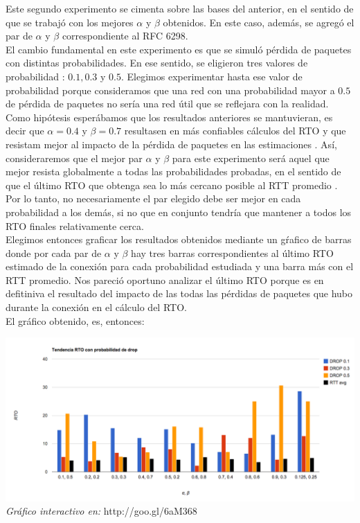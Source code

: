 \indent \indent Este segundo experimento se cimenta sobre las bases del anterior, en el sentido de que se trabajó con los mejores $\alpha$ y $\beta$ obtenidos. En este caso, además, se agregó el par de $\alpha$ y $\beta$ correspondiente al RFC 6298.\\
\indent \indent El cambio fundamental en este experimento es que se simuló pérdida de paquetes con distintas probabilidades. En ese sentido, se eligieron tres valores de probabilidad : $0.1, 0.3$ y $0.5$. Elegimos experimentar hasta ese valor de probabilidad porque consideramos que una red con una probabilidad mayor a $0.5$ de pérdida de paquetes no sería una red útil que se reflejara con la realidad.\\
\indent Como hipótesis esperábamos que los resultados anteriores se mantuvieran, es decir que $\alpha = 0.4$ y $\beta=0.7$ resultasen en más confiables cálculos del RTO y que resistam mejor al impacto de la pérdida de paquetes en las estimaciones . Así, consideraremos que el mejor par $\alpha$ y $\beta$ para este experimento será aquel que mejor resista globalmente a todas las probabilidades probadas, en el sentido de que el último RTO que obtenga sea lo más cercano posible al RTT promedio . Por lo tanto, no necesariamente el par elegido debe ser mejor en cada probabilidad a los demás, si no que en conjunto tendría que mantener a todos los RTO finales relativamente cerca.\\
\indent Elegimos entonces graficar los resultados obtenidos mediante un gŕafico de barras donde por cada par de $\alpha$ y $\beta$ hay tres barras correspondientes al último RTO estimado de la conexión para cada probabilidad estudiada y una barra más con el RTT promedio. Nos pareció oportuno analizar el último RTO porque es en defitiniva el resultado del impacto de las todas las pérdidas de paquetes que hubo durante la conexión en el cálculo del RTO.\\
\indent El gráfico obtenido, es, entonces:\\
 

\begin{center}
	\includegraphics[scale=0.35]{graphics/tendencia_RTO_drop.png}
	\textit{Gráfico interactivo en:} http://goo.gl/6aM368
\end{center}

